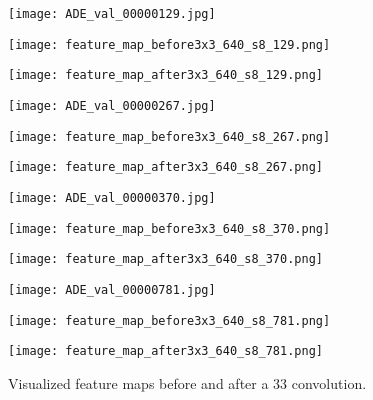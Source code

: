 \documentclass{article} \usepackage{iclr2024_conference,times}
\begin{document}
\begin{figure}
\centering
\begin{minipage}{0.8in}
\texttt{[image: ADE\_val\_00000129.jpg]}
\end{minipage}
\begin{minipage}{0.8in}
\texttt{[image: feature\_map\_before3x3\_640\_s8\_129.png]}
\end{minipage}
\begin{minipage}{0.8in}
\texttt{[image: feature\_map\_after3x3\_640\_s8\_129.png]}
\end{minipage}
\begin{minipage}{0.8in}
\texttt{[image: ADE\_val\_00000267.jpg]}
\end{minipage}
\begin{minipage}{0.8in}
\texttt{[image: feature\_map\_before3x3\_640\_s8\_267.png]}
\end{minipage}
\vspace{0.2em}
\begin{minipage}{0.8in}
\texttt{[image: feature\_map\_after3x3\_640\_s8\_267.png]}
\end{minipage}
\begin{minipage}{0.8in}
\texttt{[image: ADE\_val\_00000370.jpg]}
\end{minipage}
\begin{minipage}{0.8in}
\texttt{[image: feature\_map\_before3x3\_640\_s8\_370.png]}
\end{minipage}
\begin{minipage}{0.8in}
\texttt{[image: feature\_map\_after3x3\_640\_s8\_370.png]}
\end{minipage}
\begin{minipage}{0.8in}
\texttt{[image: ADE\_val\_00000781.jpg]}
\end{minipage}
\begin{minipage}{0.8in}
\texttt{[image: feature\_map\_before3x3\_640\_s8\_781.png]}
\end{minipage}
\begin{minipage}{0.8in}
\texttt{[image: feature\_map\_after3x3\_640\_s8\_781.png]}
\end{minipage}
\caption{Visualized feature maps before and after a 33 convolution.}
\label{fig6}
\end{figure}
\end{document}
